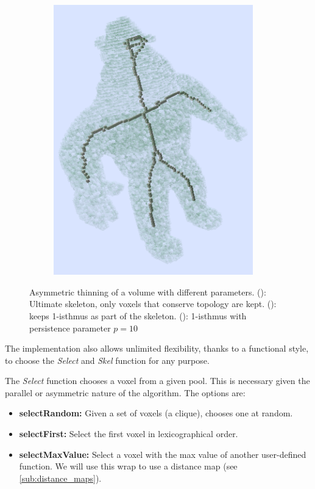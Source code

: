 \begin{figure}[!htb]
\begin{subfigure}{0.333\textwidth}
    \includegraphics[width=0.95\textwidth]{Figures/chapter-image/dgtal/voxelComplexAl1IsthtmusP10.png}%
    \caption{}
    \label{subfig:thin_al_p10}
  \end{subfigure}
  \caption{Asymmetric thinning of a volume with different parameters. (): Ultimate skeleton, only voxels that conserve topology are kept. (): keeps 1-isthmus as part of the skeleton. (): 1-isthmus with persistence parameter $p = 10$}
  \label{fig:thin_al}
\end{figure}

The implementation also allows unlimited flexibility, thanks to a functional style, to choose the \textit{Select} and \textit{Skel} function for any purpose.

The \textit{Select} function chooses a voxel from a given pool. This is necessary given the parallel or asymmetric nature of the algorithm. The options are:

\begin{itemize}[topsep=0pt]
  \item \textbf{selectRandom: } Given a set of voxels (a clique), chooses one at random.
  \item \textbf{selectFirst: } Select the first voxel in lexicographical order.
  \item \textbf{selectMaxValue: } Select a voxel with the max value of another user-defined function. We will use this wrap to use a distance map (see \autoref{sub:distance_maps}).
\end{itemize}

